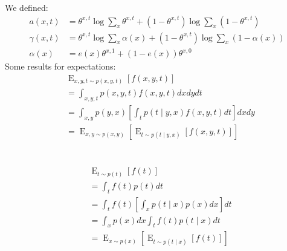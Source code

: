 \documentclass[oneside,12pt]{article}
\begin{document}
%
We defined:
\begin{equation}
    \begin{split}
        a(x,t) &= \theta^{x,t}\operatorname{log} \sum_x \theta^{x,t} + (1-\theta^{x,t})\operatorname{log} \sum_x (1-\theta^{x,t})\\
        \gamma(x,t) &= \theta^{x,t}\operatorname{log}\sum_x \alpha(x)
        + (1-\theta^{x,t})\operatorname{log}\sum_x (1 - \alpha(x))\\
        \alpha(x) &= e(x)\theta^{x,1} + (1-e(x))\theta^{x,0}
    \end{split}
\end{equation}
%
Some results for expectations:
\begin{equation*}
    \begin{split}
        &\operatorname{E}_{x,y,t \sim p(x,y,t)} \left[ f(x,y,t)\right]\\
        &= \int_{x,y,t}p(x,y,t)f(x,y,t)dxdydt\\
        &= \int_{x,y}p(y,x)\left[ \int_t p(t \mid y,x)f(x,y,t)dt\right]dxdy\\
        &= \operatorname{E}_{x,y \sim p(x,y)} \left[\operatorname{E}_{t \sim p(t \mid y,x)}\left[ f(x,y,t)\right] \right]
    \end{split}
\end{equation*}
\\\\
\begin{equation*}
    \begin{split}
        &\operatorname{E}_{t \sim p(t)}\left[f(t)\right]\\
        &= \int_t f(t)p(t)dt\\
        &= \int_t f(t) \left[ \int_x p(t \mid x) p(x) dx \right]dt\\
        &= \int_x p(x)dx \int_t f(t) p(t \mid x) dt\\
        &= \operatorname{E}_{x \sim p(x)} \left[ \operatorname{E}_{t \sim p(t \mid x)} \left[ f(t)\right]\right]
    \end{split}
\end{equation*}
%
\end{document}
